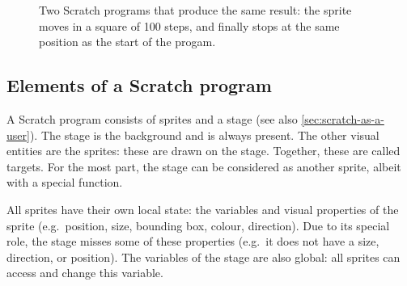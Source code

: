 \documentclass[../main]{subfiles}
\begin{document}
\begin{figure}
    \centering
    \begin{subfigure}{0.45\textwidth}
        \centering
        \begin{scratch}[scale=1]
        \end{scratch}
    \end{subfigure}
    \begin{subfigure}{0.45\textwidth}
        \centering
        \begin{scratch}[scale=1]
        \end{scratch}
    \end{subfigure}
    \caption{Two Scratch programs that produce the same result: the sprite moves in a square of 100 steps, and finally stops at the same position as the start of the progam.}\label{fig:scratch-two-programs}
\end{figure}

\subsection{Elements of a Scratch program}\label{subsec:elements-of-a-scratch-program}

A Scratch program consists of sprites and a stage (see also \vref{sec:scratch-as-a-user}).
The stage is the background and is always present.
The other visual entities are the sprites: these are drawn on the stage.
Together, these are called targets.
For the most part, the stage can be considered as another sprite, albeit with a special function.

All sprites have their own local state: the variables and visual properties of the sprite (e.g.\ position, size, bounding box, colour, direction).
Due to its special role, the stage misses some of these properties (e.g.\ it does not have a size, direction, or position).
The variables of the stage are also global: all sprites can access and change this variable.
\end{document}
